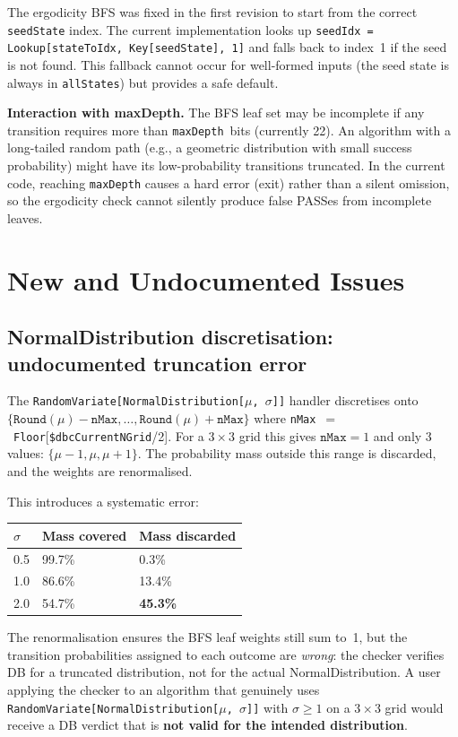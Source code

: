 \documentclass[12pt,a4paper]{article}
\theoremstyle{critical}
\theoremstyle{remark}
\theoremstyle{verified}
\begin{document}
The ergodicity BFS was fixed in the first revision to start from the correct
\texttt{seedState} index.  The current implementation looks up
\texttt{seedIdx = Lookup[stateToIdx, Key[seedState], 1]} and falls back to
index~1 if the seed is not found.  This fallback cannot occur for well-formed
inputs (the seed state is always in \texttt{allStates}) but provides a safe
default.

\textbf{Interaction with maxDepth.}
The BFS leaf set may be incomplete if any transition requires more than
\texttt{maxDepth}~bits (currently 22).  An algorithm with a long-tailed random
path (e.g., a geometric distribution with small success probability) might have
its low-probability transitions truncated.  In the current code, reaching
\texttt{maxDepth} causes a hard error (exit) rather than a silent omission, so
the ergodicity check cannot silently produce false PASSes from incomplete leaves.

\section{New and Undocumented Issues}
\label{sec:newissues}

\subsection{NormalDistribution discretisation: undocumented truncation error}
\label{sec:normaldist}

The \texttt{RandomVariate[NormalDistribution[$\mu$, $\sigma$]]} handler
discretises onto $\{\texttt{Round}(\mu)-\texttt{nMax}, \ldots,
\texttt{Round}(\mu)+\texttt{nMax}\}$ where
\texttt{nMax}~$=$~\texttt{Floor}[\texttt{\$dbcCurrentNGrid}/2].  For a
$3\times3$ grid this gives $\texttt{nMax}=1$ and only 3 values: $\{\mu-1, \mu,
\mu+1\}$.  The probability mass outside this range is discarded, and the weights
are renormalised.

This introduces a systematic error:
\begin{center}
\begin{tabular}{lll}
\toprule
$\sigma$ & Mass covered & Mass discarded \\
\midrule
0.5 & 99.7\% & 0.3\% \\
1.0 & 86.6\% & 13.4\% \\
2.0 & 54.7\% & \textbf{45.3\%} \\
\bottomrule
\end{tabular}
\end{center}
The renormalisation ensures the BFS leaf weights still sum to~1, but the
transition probabilities assigned to each outcome are \emph{wrong}: the checker
verifies DB for a truncated distribution, not for the actual NormalDistribution.
A user applying the checker to an algorithm that genuinely uses
\texttt{RandomVariate[NormalDistribution[$\mu$, $\sigma$]]} with $\sigma \geq 1$
on a $3\times3$ grid would receive a DB verdict that is \textbf{not valid for the
intended distribution}.
\end{document}
